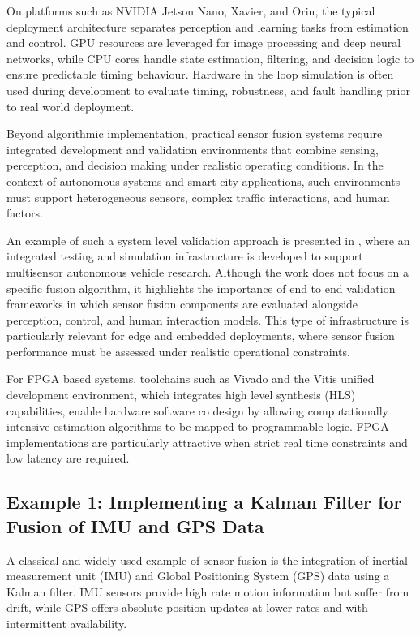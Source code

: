 \documentclass[journal]{IEEEtran}
\begin{document}
On platforms such as NVIDIA Jetson Nano, Xavier, and Orin, the typical deployment architecture separates perception and learning tasks from estimation and control. GPU resources are leveraged for image processing and deep neural networks, while CPU cores handle state estimation, filtering, and decision logic to ensure predictable timing behaviour. Hardware in the loop simulation is often used during development to evaluate timing, robustness, and fault handling prior to real world deployment.

Beyond algorithmic implementation, practical sensor fusion systems require integrated development and validation environments that combine sensing, perception, and decision making under realistic operating conditions. In the context of autonomous systems and smart city applications, such environments must support heterogeneous sensors, complex traffic interactions, and human factors.

An example of such a system level validation approach is presented in \cite{deliparaschos_preliminary_2020}, where an integrated testing and simulation infrastructure is developed to support multisensor autonomous vehicle research. Although the work does not focus on a specific fusion algorithm, it highlights the importance of end to end validation frameworks in which sensor fusion components are evaluated alongside perception, control, and human interaction models. This type of infrastructure is particularly relevant for edge and embedded deployments, where sensor fusion performance must be assessed under realistic operational constraints.

For FPGA based systems, toolchains such as Vivado and the Vitis unified development environment, which integrates high level synthesis (HLS) capabilities, enable hardware software co design by allowing computationally intensive estimation algorithms to be mapped to programmable logic. FPGA implementations are particularly attractive when strict real time constraints and low latency are required.

\subsection{Example 1: Implementing a Kalman Filter for Fusion of IMU and GPS Data}

A classical and widely used example of sensor fusion is the integration of inertial measurement unit (IMU) and Global Positioning System (GPS) data using a Kalman filter. IMU sensors provide high rate motion information but suffer from drift, while GPS offers absolute position updates at lower rates and with intermittent availability.
\end{document}
